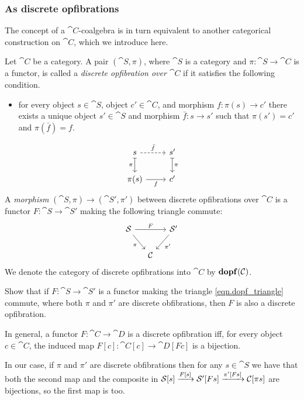 \documentclass[Book-Poly]{subfiles}
\begin{document}
\subsubsection{As discrete opfibrations}

The concept of a $\cat{C}$-coalgebra is in turn equivalent to another categorical construction on $\cat{C}$, which we introduce here.

\begin{definition}\label{def.dopf}
Let $\cat{C}$ be a category. A pair $(\cat{S},\pi)$, where $\cat{S}$ is a category and $\pi\colon\cat{S}\to\cat{C}$ is a functor, is called a \emph{discrete opfibration over $\cat{C}$} if it satisfies the following condition.
\begin{itemize}
	\item for every object $s\in\cat{S}$, object $c'\in\cat{C}$, and morphism $f\colon \pi(s)\to c'$ there exists a unique object $s'\in\cat{S}$ and morphism $\bar{f}\colon s\to s'$ such that $\pi(s')=c'$ and $\pi(\bar{f})=f$.
\end{itemize}
\[
\begin{tikzcd}
  s\ar[r, dashed, "\bar{f}"]\ar[d, |->, "\pi"']&
  s'\ar[d, |->, "\pi"]\\
  \pi(s)\ar[r, "f"']&
  c'
\end{tikzcd}
\]
A \emph{morphism} $(\cat{S},\pi)\to(\cat{S}',\pi')$ between discrete opfibrations over $\cat{C}$ is a functor $F\colon\cat{S}\to\cat{S}'$ making the following triangle commute:
\begin{equation}\label{eqn.dopf_triangle}
\begin{tikzcd}[column sep=small]
	\cat{S}\ar[dr, "\pi"']\ar[rr, "F"]&&
	\cat{S}'\ar[dl, "\pi'"]\\&
	\cat{C}
\end{tikzcd}
\end{equation}
We denote the category of discrete opfibrations into $\cat{C}$ by $\mathbf{dopf}(\mathcal{C})$.
\end{definition}

\begin{exercise}
Show that if $F\colon \cat{S}\to\cat{S}'$ is a functor making the triangle \eqref{eqn.dopf_triangle} commute, where both $\pi$ and $\pi'$ are discrete obfibrations, then $F$ is also a discrete opfibration.
\begin{solution}
In general, a functor $F\colon\cat{C}\to\cat{D}$ is a discrete opfibration iff, for every object $c\in\cat{C}$, the induced map $F[c]\colon\cat{C}[c]\to\cat{D}[Fc]$ is a bijection. 

In our case, if $\pi$ and $\pi'$ are discrete obfibrations then for any $s\in\cat{S}$ we have that both the second map and the composite in $\mathcal{S}[s]\xrightarrow{F[s]}\mathcal{S}'[Fs]\xrightarrow{\pi'[Fs]}\mathcal{C}[\pi s]$ are bijections, so the first map is too.
\end{solution}
\end{exercise}
\end{document}
